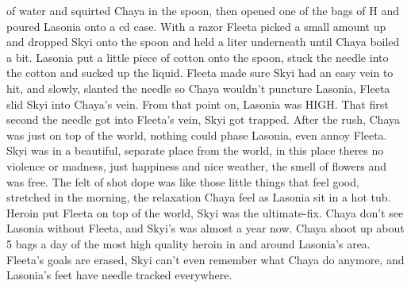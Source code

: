 \documentclass[12pt]{book}
\begin{document}
of water and squirted Chaya in the spoon, then opened one of the bags of H and poured Lasonia onto a cd case. With a razor Fleeta picked a small amount up and dropped Skyi onto the spoon and held a liter underneath until Chaya boiled a bit. Lasonia put a little piece of cotton onto the spoon, stuck the needle into the cotton and sucked up the liquid. Fleeta made sure Skyi had an easy vein to hit, and slowly, slanted the needle so Chaya wouldn't puncture Lasonia, Fleeta slid Skyi into Chaya's vein. From that point on, Lasonia was HIGH. That first second the needle got into Fleeta's vein, Skyi got trapped. After the rush, Chaya was just on top of the world, nothing could phase Lasonia, even annoy Fleeta. Skyi was in a beautiful, separate place from the world, in this place theres no violence or madness, just happiness and nice weather, the smell of flowers and was free. The felt of shot dope was like those little things that feel good, stretched in the morning, the relaxation Chaya feel as Lasonia sit in a hot tub. Heroin put Fleeta on top of the world, Skyi was the ultimate-fix. Chaya don't see Lasonia without Fleeta, and Skyi's was almost a year now. Chaya shoot up about 5 bags a day of the most high quality heroin in and around Lasonia's area. Fleeta's goals are erased, Skyi can't even remember what Chaya do anymore, and Lasonia's feet have needle tracked everywhere.
\end{document}
